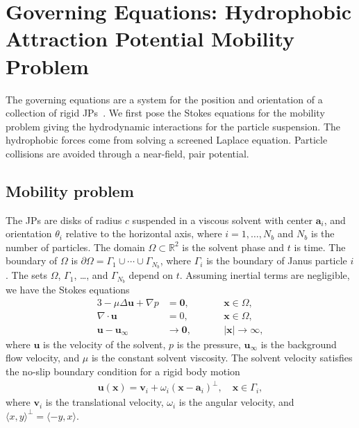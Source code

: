 \documentclass[prb,preprint,showpacs,preprintnumbers,amsmath,amssymb,longbibliography]{revtex4-1}
\renewcommand{\aa}{\mathbf{a}}
\newcommand{\bd}{\partial}
\newcommand{\xx}{\mathbf{x}}
\newcommand{\uu}{\mathbf{u}}
\renewcommand{\vv}{\mathbf{v}}
\begin{document}
\section{Governing Equations: Hydrophobic Attraction Potential Mobility Problem} 
The governing equations are a system for the position and
orientation of a collection of rigid JPs~\cite{Fu2022_JFM}.
We first pose the
Stokes equations for the mobility problem giving the hydrodynamic
interactions for the particle suspension. The hydrophobic forces come
from solving a screened Laplace equation. Particle collisions are
avoided through a near-field, pair potential.

\subsection{Mobility problem}
The JPs are disks of radius $c$ suspended in a viscous solvent
with center $\aa_i$, and orientation $\theta_i$
relative to the horizontal axis, where $i = 1, \ldots, N_b$ and $N_b$ is
the number of particles. The domain $\Omega \subset \mathbb{R}^2$ is
the solvent phase and $t$ is time. The boundary of $\Omega$ is
$\bd\Omega = \Gamma_1 \cup \cdots \cup \Gamma_{N_b}$, where $\Gamma_i$
is the boundary of Janus particle $i$.
The sets $\Omega$, $\Gamma_1$, \dots, and $\Gamma_{N_b}$ depend on $t$.
Assuming inertial terms are negligible, we have the Stokes equations
\begin{alignat}{3}
\label{eq:stokes}
  -\mu \Delta \uu + \nabla p &= \mathbf{0}, && \xx \in \Omega, \\
\label{eq:stokesMass}
  \nabla\cdot \uu &= 0, \qquad && \xx \in \Omega, \\
\label{eq:stokesFarfield}
  \uu - \uu_\infty &\to \mathbf{0}, && |\xx| \to \infty,
\end{alignat}
where $\uu$ is the velocity of the solvent, $p$ is the pressure,
$\uu_\infty$ is the background flow velocity, and $\mu$ is the constant
solvent viscosity. The solvent velocity satisfies the no-slip boundary
condition for a rigid body motion
\begin{align}
  \label{eq:rigid-vel}
  \uu(\xx) = \vv_i + \omega_i (\xx - \aa_i)^\perp, 
    \quad \xx \in \Gamma_i,
\end{align}
where $\vv_i$ is the translational velocity, $\omega_i$ is the angular
velocity, and $\langle x, y \rangle^{\perp} = \langle -y, x\rangle$. 
\end{document}
